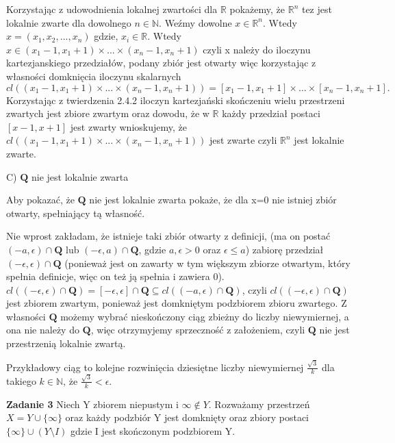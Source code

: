 \documentclass[12pt,a4paper]{article}
\def\N{\mathbb{N}}
\def\R{\mathbb{R}}
\newcommand{\zadanie}[1]{\par\textbf{Zadanie #1}}
\begin{document}
Korzystając z udowodnienia  lokalnej zwartości dla $\R$ pokażemy, że $\R^n$ tez jest lokalnie zwarte dla dowolnego $n \in \N$. Weźmy dowolne $x \in \R^n$. Wtedy $x = (x_1, x_2, ..., x_n)$ gdzie, $x_i \in \R$. Wtedy $x \in (x_1 - 1, x_1 +1) \times ... \times (x_n -1, x_n +1)$ czyli x należy do iloczynu kartezjanskiego przedziałów, podany zbiór jest otwarty więc korzystając z własności domknięcia iloczynu skalarnych $cl((x_1 - 1, x_1 +1) \times ... \times (x_n -1, x_n +1)) = [x_1 - 1, x_1 +1] \times ... \times [x_n -1, x_n +1].$ Korzystając z twierdzenia 2.4.2 iloczyn kartezjański skończeniu wielu przestrzeni zwartych jest zbiore zwartym oraz dowodu, że w $\R$ każdy przedział postaci $[x-1,x+1]$ jest zwarty wnioskujemy, że $cl((x_1 - 1, x_1 +1) \times ... \times (x_n -1, x_n +1))$ jest zwarte czyli $\R^n$ jest lokalnie zwarte.

C) $\mathbf Q$ nie jest lokalnie zwarta

Aby pokazać, że $\mathbf Q$ nie jest lokalnie zwarta pokaże, że dla x=0 nie istniej zbiór otwarty, spełniający tą własność.

Nie wprost zakładam, że istnieje taki zbiór otwarty z definicji, (ma on postać $(-a, \epsilon) \cap \mathbf Q$ lub $(-\epsilon, a) \cap \mathbf Q$, gdzie $a, \epsilon > 0$ oraz $\epsilon \leq a$) zabiorę przedział $(-\epsilon, \epsilon) \cap \mathbf Q$ (ponieważ jest on zawarty w tym większym zbiorze otwartym, który spełnia definicje, więc on też ją spełnia i zawiera 0). $cl((-\epsilon, \epsilon) \cap \mathbf Q) = [-\epsilon, \epsilon] \cap \mathbf Q \subseteq cl((-a, \epsilon) \cap \mathbf Q)$, czyli  $cl((-\epsilon, \epsilon) \cap \mathbf Q)$ jest zbiorem zwartym, ponieważ jest domkniętym podzbiorem zbioru zwartego. Z własności $\mathbf Q$ możemy wybrać nieskończony ciąg zbieżny do liczby niewymiernej, a ona nie należy do $\mathbf Q$, więc otrzymyjemy sprzeczność z założeniem, czyli $\mathbf Q$ nie jest przestrzenią lokalnie zwartą.

Przykładowy ciąg to kolejne rozwinięcia dziesiętne liczby niewymiernej $\frac{\sqrt{3}}{k}$ dla takiego $k \in \N$, że $\frac{\sqrt{3}}{k} < \epsilon$.

\zadanie{3}
Niech Y zbiorem niepustym i $\infty \notin Y$.
Rozważamy przestrzeń $X = Y \cup \{\infty\}$ oraz każdy podzbiór Y jest domknięty oraz zbiory postaci $\{\infty\} \cup (Y\setminus I)$ gdzie I jest skończonym podzbiorem Y.
\end{document}
